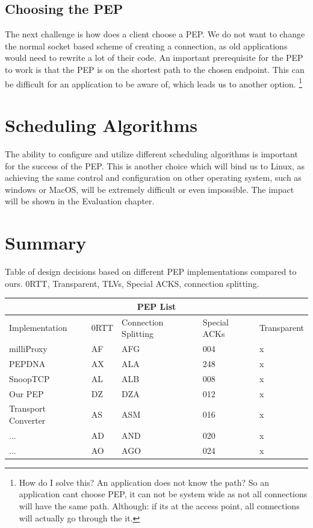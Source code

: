 \documentclass[a4paper,english, 11pt]{report}
\begin{document}
\subsection{Choosing the PEP}
The next challenge is how does a client choose a PEP. We do not want to change the normal socket based scheme of creating a connection, as old applications would need to rewrite a lot of their code. An important prerequisite for the PEP to work is that the PEP is on the shortest path to the chosen endpoint. This can be difficult for an application to be aware of, which leads us to another option. \footnote{How do I solve this? An application does not know the path? So an application cant choose PEP, it can not be system wide as not all connections will have the same path. Although: if its at the access point, all connections will actually go through the it.}


\section{Scheduling Algorithms}
The ability to configure and utilize different scheduling algorithms is important for the success of the PEP. This is another choice which will bind us to Linux, as achieving the same control and configuration on other operating system, such as windows or MacOS, will be extremely difficult or even impossible. The impact will be shown in the Evaluation chapter.



\section{Summary}

{Table of design decisions based on different PEP implementations compared to ours.}
{0RTT, Transparent, TLVs, Special ACKS, connection splitting.}\\
\begin{tabular}{ |p{4cm}||p{2cm}|p{2cm}|p{2cm}|p{2cm}| }
 \hline
 \multicolumn{5}{|c|}{PEP List} \\
 \hline
 Implementation& 0RTT &Connection Splitting &Special ACKs &Transparent\\
 \hline
 milliProxy   & AF    &AFG&   004 & x\\
 PEPDNA&   AX  & ALA   &248 & x\\
 SnoopTCP &AL & ALB&  008 & x\\
 Our PEP    &DZ & DZA&  012& x \\
 Transport Converter &   AS  & ASM&016& x\\
 ...& AD  & AND   &020& x\\
 ...& AO  & AGO&024& x\\
 \hline
\end{tabular}
\end{document}
